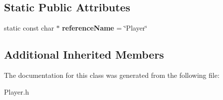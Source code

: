 \subsection*{Static Public Attributes}
\begin{DoxyCompactItemize}
\item 
\hypertarget{class_arena_1_1_player_a10fbc13ca917fd12d711f8fb363b4da9}{static const char $\ast$ {\bfseries reference\+Name} = \char`\"{}Player\char`\"{}}\label{class_arena_1_1_player_a10fbc13ca917fd12d711f8fb363b4da9}

\end{DoxyCompactItemize}
\subsection*{Additional Inherited Members}


The documentation for this class was generated from the following file\+:\begin{DoxyCompactItemize}
\item 
Player.\+h\end{DoxyCompactItemize}
